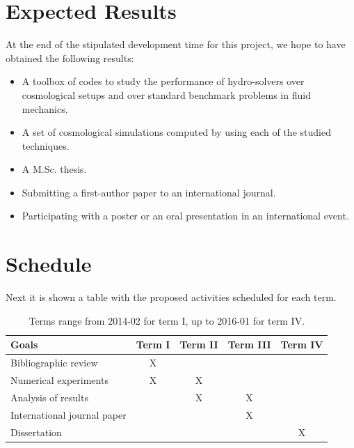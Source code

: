 \documentclass[a4,useAMS,usenatbib,usegraphicx,12pt]{article}
\begin{document}
\section{Expected Results}
At the end of the stipulated development time for this project, we hope to have
obtained the following results:
\begin{itemize}
\item A toolbox of codes to study the performance of hydro-solvers over 
cosmological setups and over standard benchmark problems in fluid mechanics.
\item A set of cosmological simulations computed by using each of the studied
techniques.
\item A M.Sc. thesis.
\item Submitting a first-author paper to an international journal.
\item Participating with a poster or an oral presentation in an international
event.
\end{itemize}


\section{Schedule}
Next it is shown a table with the proposed activities scheduled for each term.

\begin{table}[h]
\begin{flushleft}
\begin{center}
  \begin{tabular}{l  c c c c } \hline\hline
	\centering\textbf{Goals} & \textbf{Term I} & \textbf{Term II} & 
	\textbf{Term III} & \textbf{Term IV} \\ \hline\hline
	
	 Bibliographic review & X & & & \\
	 Numerical experiments & X & X & & \\
	 Analysis of results &  & X & X & \\
	 International journal paper &  &  & X & \\
	 Dissertation &  &  &  & X \\
	\hline\hline
  \end{tabular}  
  \caption{ Terms range from 2014-02 for term I, up to 2016-01 for term IV.}
\end{center}
\end{flushleft}
\end{table}



\renewcommand{\bibname}{8\ \ \ \ Bibliography}
\small

\end{document}
